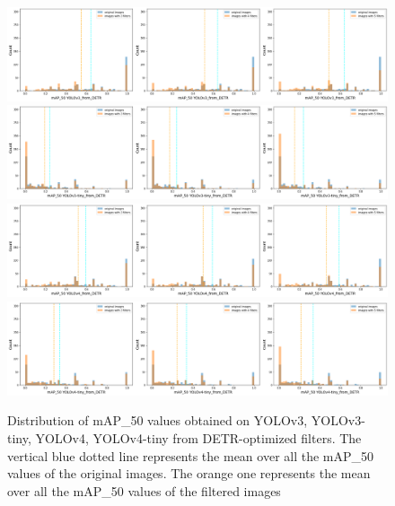 \begin{figure}[h] 
\centering
\includegraphics[width=1\textwidth]{Experiments/imgs/y3d.png}
\includegraphics[width=1\textwidth]{Experiments/imgs/y3td.png}
\includegraphics[width=1\textwidth]{Experiments/imgs/y4d.png}
\includegraphics[width=1\textwidth]{Experiments/imgs/y4td.png}
\caption{Distribution of mAP\_50 values obtained on YOLOv3, YOLOv3-tiny, YOLOv4, YOLOv4-tiny from DETR-optimized filters. The vertical blue dotted line represents the mean over all the mAP\_50 values of the original images. The orange one represents the mean over all the mAP\_50 values of the filtered images}
\label{hysto_transfer}
\end{figure}

